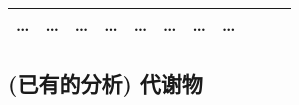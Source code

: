 \documentclass[
]{article}
\begin{document}
\begin{longtable}[]{@{}lllllllllll@{}}
\begin{minipage}[t]{0.06\columnwidth}
\ldots{}\strut
\end{minipage} & \begin{minipage}[t]{0.09\columnwidth}\raggedright
\ldots{}\strut
\end{minipage} & \begin{minipage}[t]{0.06\columnwidth}\raggedright
\ldots{}\strut
\end{minipage} & \begin{minipage}[t]{0.09\columnwidth}\raggedright
\ldots{}\strut
\end{minipage} & \begin{minipage}[t]{0.06\columnwidth}\raggedright
\ldots{}\strut
\end{minipage} & \begin{minipage}[t]{0.06\columnwidth}\raggedright
\ldots{}\strut
\end{minipage} & \begin{minipage}[t]{0.06\columnwidth}\raggedright
\ldots{}\strut
\end{minipage} & \begin{minipage}[t]{0.03\columnwidth}\raggedright
\ldots{}\strut
\end{minipage}\tabularnewline
\bottomrule
\end{longtable}

\hypertarget{ux5df2ux6709ux7684ux5206ux6790-ux4ee3ux8c22ux7269}{%
\subsection{(已有的分析) 代谢物}\label{ux5df2ux6709ux7684ux5206ux6790-ux4ee3ux8c22ux7269}}
\end{document}

